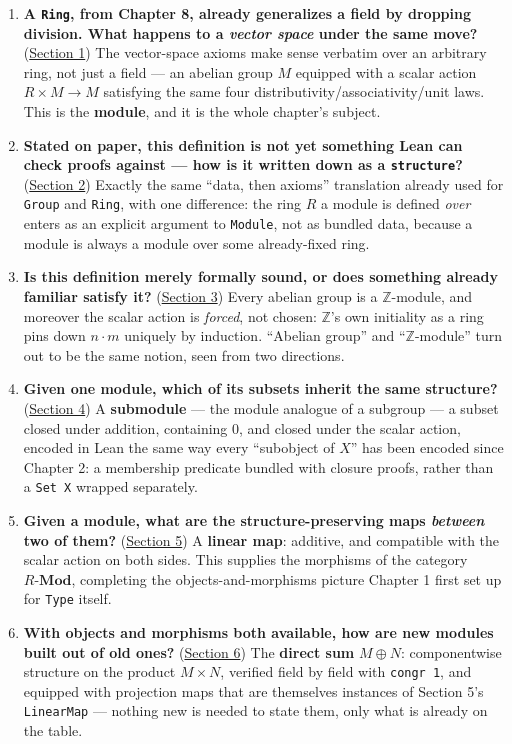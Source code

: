 \begin{enumerate}
\def\labelenumi{\arabic{enumi}.}
\tightlist
\item
  \textbf{A \texttt{Ring}, from Chapter 8, already generalizes a field by dropping division. What happens to a \emph{vector space} under the same move?} (\hyperref[sec:10-modules:01-definition:1]{Section 1}) The vector-space axioms make sense verbatim over an arbitrary ring, not just a field --- an abelian group \(M\) equipped with a scalar action \(R \times M \to M\) satisfying the same four distributivity/associativity/unit laws. This is the \textbf{module}, and it is the whole chapter's subject.
\item
  \textbf{Stated on paper, this definition is not yet something Lean can check proofs against --- how is it written down as a \texttt{structure}?} (\hyperref[sec:10-modules:02-translating-into-lean:1]{Section 2}) Exactly the same ``data, then axioms'' translation already used for \texttt{Group} and \texttt{Ring}, with one difference: the ring \(R\) a module is defined \emph{over} enters as an explicit argument to \texttt{Module}, not as bundled data, because a module is always a module over some already-fixed ring.
\item
  \textbf{Is this definition merely formally sound, or does something already familiar satisfy it?} (\hyperref[sec:10-modules:03-z-module-example:1]{Section 3}) Every abelian group is a \(\mathbb{Z}\)-module, and moreover the scalar action is \emph{forced}, not chosen: \(\mathbb{Z}\)'s own initiality as a ring pins down \(n \cdot m\) uniquely by induction. ``Abelian group'' and ``\(\mathbb{Z}\)-module'' turn out to be the same notion, seen from two directions.
\item
  \textbf{Given one module, which of its subsets inherit the same structure?} (\hyperref[sec:10-modules:04-submodules:1]{Section 4}) A \textbf{submodule} --- the module analogue of a subgroup --- a subset closed under addition, containing \(0\), and closed under the scalar action, encoded in Lean the same way every ``subobject of \(X\)'' has been encoded since Chapter 2: a membership predicate bundled with closure proofs, rather than a \texttt{Set X} wrapped separately.
\item
  \textbf{Given a module, what are the structure-preserving maps \emph{between} two of them?} (\hyperref[sec:10-modules:05-linear-maps:1]{Section 5}) A \textbf{linear map}: additive, and compatible with the scalar action on both sides. This supplies the morphisms of the category \(R\text{-}\mathbf{Mod}\), completing the objects-and-morphisms picture Chapter 1 first set up for \texttt{Type} itself.
\item
  \textbf{With objects and morphisms both available, how are new modules built out of old ones?} (\hyperref[sec:10-modules:06-direct-sums:1]{Section 6}) The \textbf{direct sum} \(M \oplus N\): componentwise structure on the product \(M \times N\), verified field by field with \texttt{congr 1}, and equipped with projection maps that are themselves instances of Section 5's \texttt{LinearMap} --- nothing new is needed to state them, only what is already on the table.
\end{enumerate}

